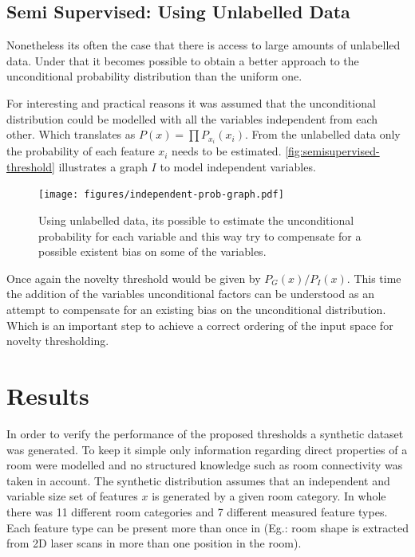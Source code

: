 \documentclass[runningheads,a4paper]{llncs}
\begin{document}
\subsection{Semi Supervised: Using Unlabelled Data}
Nonetheless its often the case that there is access to large amounts of unlabelled data.
Under that it becomes possible to obtain a better approach to the unconditional probability
distribution than the uniform one.

For interesting and practical reasons it was assumed that the unconditional distribution
could be modelled with all the variables independent from each other.
Which translates as $P(x)=\prod{P_{x_i}(x_i)}$.
From the unlabelled data only the probability of each feature $x_i$ needs to be estimated.
\autoref{fig:semisupervised-threshold} illustrates a graph $I$ to model independent variables.

\begin{figure}[h]
\centering
\texttt{[image: figures/independent-prob-graph.pdf]}
\caption{\label{fig:semisupervised-threshold}Using unlabelled data, its possible to estimate
         the unconditional probability for each variable and this way try to compensate
         for a possible existent bias on some of the variables.}
\end{figure}

Once again the novelty threshold would be given by $P_G(x)/P_I(x)$.
This time the addition of the variables unconditional factors can be understood as an
attempt to compensate for an existing bias on the unconditional distribution.
Which is an important step to achieve a correct ordering of the input space for novelty
thresholding.


\section{Results}
In order to verify the performance of the proposed thresholds a synthetic dataset
was generated. To keep it simple only information regarding direct properties of
a room were modelled and no structured knowledge such as room connectivity was taken
in account.
The synthetic distribution assumes that an independent and variable size set of features
$x$ is generated by a given room category.
In whole there was 11 different room categories and 7 different measured feature
types. Each feature type can be present more than once in (Eg.: room shape is
extracted from 2D laser scans in more than one position in the room).
\end{document}
